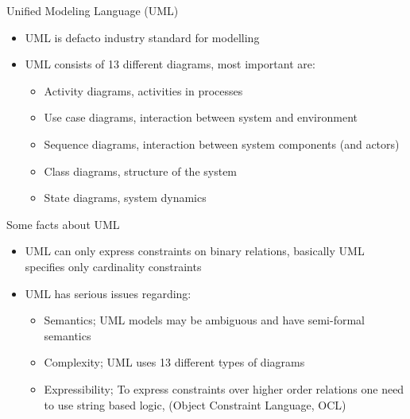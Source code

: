 \documentclass[slidetop,mathserif,red]{beamer}
\begin{document}
 \begin{frame}{Unified Modeling Language (UML)}
    \begin{itemize}
    \item UML is defacto industry standard for modelling

    \item UML consists of 13 different diagrams, most important are:
        \begin{itemize}
        \item Activity diagrams, activities in processes
        \item Use case diagrams, interaction between system and environment
        \item Sequence diagrams, interaction between system components (and actors)
        \item Class diagrams, structure of the system
        \item State diagrams, system dynamics
        \end{itemize}
    \end{itemize}
\end{frame}

\begin{frame}{Some facts about UML}
    \begin{itemize}

    \item UML can only express constraints on binary relations, basically UML specifies only cardinality constraints

    \item UML has serious issues regarding:
        \begin{itemize}
        \item Semantics; UML models may be ambiguous and have
        semi-formal semantics
        \item Complexity; UML uses 13 different types of diagrams
        \item Expressibility; To express constraints over higher
        order relations one need to use string based logic, (Object Constraint Language, OCL)
        \end{itemize}
    \end{itemize}
\end{frame}
\end{document}
